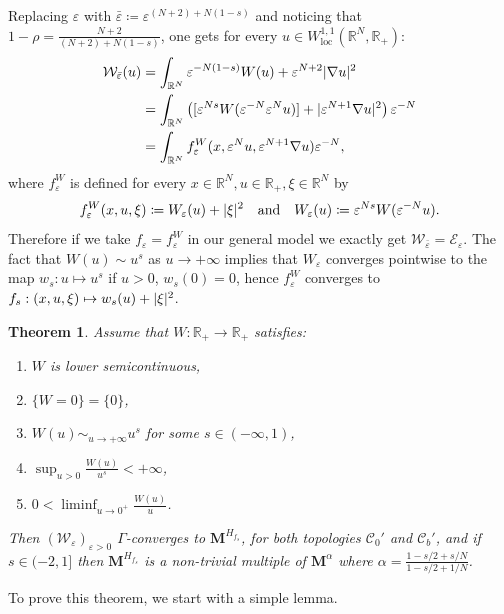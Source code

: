 \documentclass[JEP,XML,SOM,Unicode,published]{cedram}
\theoremstyle{plain}
\newtheorem{theorem}{Theorem}[section]
\theoremstyle{definition}
\newcommand{\R}{\mathbb{R}}
\newcommand{\Cspace}{\mathscr{C}}
\newcommand{\ener}{\mathcal{E}}
\newcommand{\mass}{\boldsymbol{M}}
\newcommand{\loc}{\mathrm{loc}}
\newcommand{\eps}{\varepsilon}
\DeclarePairedDelimiter{\abs}{\lvert}{\rvert}
\begin{document}
Replacing $\eps$ with $\bar \eps \coloneqq \eps^{(N+2)+N(1-s)}$ and noticing that $1-\rho = \frac{N+2}{(N+2)+N(1-s)}$, one gets for every $u\in W^{1,1}_\loc(\R^N,\R_+)$:
\begin{align*}
\mathcal W_{\bar \eps}(u)&= \int_{\R^N} \eps^{-N(1-s)} W(u) + \eps^{N+2} \abs{\nabla u}^2\\ &= \int_{\R^N} \left( [\eps^{Ns} W(\eps^{-N} \eps^N u)] + \abs{\eps^{N+1} \nabla u}^2 \right) \eps^{-N}\\
&= \int_{\R^N} f_\eps^W(x,\eps^N u,\eps^{N+1} \nabla u) \eps^{-N},
\end{align*}
where $f_\eps^W$ is defined for every $x\in \R^N,u\in \R_+, \xi \in \R^N$ by
\begin{equation*}
f_\eps^W(x,u,\xi) \coloneqq W_\eps(u) + \abs{\xi}^2 \quad \text{and}\quad W_\eps(u) \coloneqq \eps^{Ns} W(\eps^{-N}u).
\end{equation*}
Therefore if we take $f_\eps = f_\eps^W$ in our general model  we exactly get $\mathcal W_{\bar\eps} = \ener_\eps$. The fact that $W(u) \sim u^s$ as $u \to +\infty$ implies that $W_\eps$ converges pointwise to the map $w_s : u \mapsto u^s$ if $u > 0$, $w_s(0) = 0$, hence $f_\eps^W$ converges to $f_s : (x,u,\xi) \mapsto w_s(u) + \abs{\xi}^2$.
\begin{theorem}\label{GammaConvergenceW}
Assume that $W : \R_+ \to \R_+$ satisfies:
\begin{enumerate}[\textnormal{(HW}$_1$\textnormal{)},leftmargin=2.5\normalparindent]
\item\label{hypWlsc} $W$ is lower semicontinuous,
\item\label{hypWzero} $\{W = 0 \} = \{ 0\}$,
\item\label{hypWpower} $W(u) \sim_{u\to +\infty} u^s$ for some $s\in (-\infty,1)$,
\item\label{hypWbound} $\displaystyle\sup_{u>0} \frac{W(u)}{u^s} < +\infty$,
\item\label{hypWslope} $\displaystyle 0 < \liminf_{u\to 0^+}\frac{W(u)}u$.
\end{enumerate}
Then $(\mathcal W_\eps)_{\eps > 0}$ $\Gamma$-converges to $\mass^{H_{f_s}}$, for both topologies $\Cspace_0'$ and $\Cspace_b'$, and if $s \in (-2,1]$ then $\mass^{H_{f_s}}$ is a non-trivial multiple of $\mass^\alpha$ where $\alpha = \frac{1-s/2+s/N}{1-s/2+1/N}$.
\end{theorem}

To prove this theorem, we start with a simple lemma.
\end{document}
